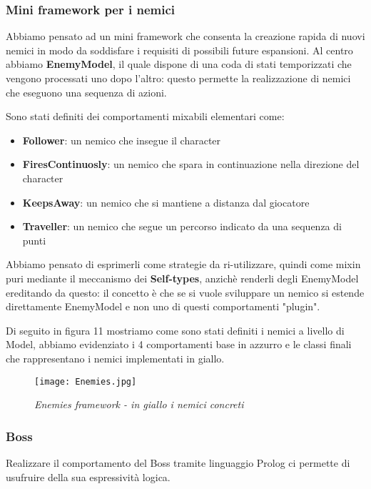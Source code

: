 \subsubsection{Mini framework per i nemici}

Abbiamo pensato ad un mini framework che consenta la creazione rapida di nuovi nemici in modo da soddisfare i requisiti di possibili future espansioni.
Al centro abbiamo \textbf{EnemyModel}, il quale dispone di una coda di stati temporizzati che vengono processati uno dopo l'altro: questo permette la realizzazione di nemici che eseguono una sequenza di azioni.

Sono stati definiti dei comportamenti mixabili elementari come:
\begin{itemize}
    \item \textbf{Follower}: un nemico che insegue il character
    \item \textbf{FiresContinuosly}: un nemico che spara in continuazione nella direzione del character
    \item \textbf{KeepsAway}: un nemico che si mantiene a distanza dal giocatore
    \item \textbf{Traveller}: un nemico che segue un percorso indicato da una sequenza di punti
\end{itemize}

Abbiamo pensato di esprimerli come strategie da ri-utilizzare, quindi come mixin puri mediante il meccanismo dei \textbf{Self-types}, anzichè renderli degli EnemyModel ereditando da questo: il concetto è che se si vuole sviluppare un nemico si estende direttamente EnemyModel e non uno di questi comportamenti "plugin".

Di seguito in figura 11 mostriamo come sono stati definiti i nemici a livello di Model, abbiamo evidenziato i 4 comportamenti base in azzurro e le classi finali che rappresentano i nemici implementati in giallo.

\begin{figure}[!hbt]
    \centering
    \texttt{[image: Enemies.jpg]}
    \caption{\textit{Enemies framework - in giallo i nemici concreti}}
\end{figure}

\subsubsection{Boss}

Realizzare il comportamento del Boss tramite linguaggio Prolog ci permette di usufruire della sua espressività logica.

